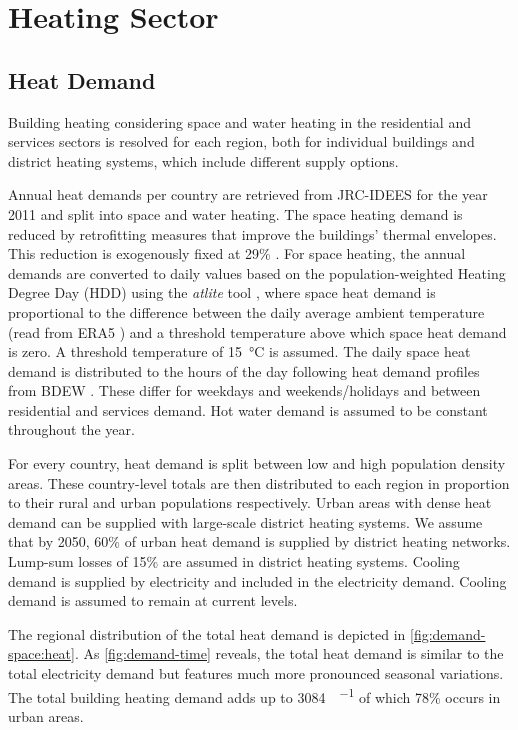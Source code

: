 \section{Heating Sector}
\label{sec:si:heat}

\subsection{Heat Demand}
\label{sec:si:heat:demand}

Building heating considering space and water heating in the residential and
services sectors is resolved for each region, both for individual buildings and
district heating systems, which include different supply options.

Annual heat demands per country are retrieved from JRC-IDEES  for
the year 2011 and split into space and water heating. The space heating demand
is reduced by retrofitting measures that improve the buildings' thermal
envelopes. This reduction is exogenously fixed at 29\%
. For space
heating, the annual demands are converted to daily values based on the
population-weighted Heating Degree Day (HDD) using the \textit{atlite} tool
, where space heat demand is proportional to the difference between the
daily average ambient temperature (read from ERA5 ) and a threshold
temperature above which space heat demand is zero. A threshold temperature of
\SI{15}{\celsius} is assumed. The daily space heat demand is distributed to the
hours of the day following heat demand profiles from BDEW \citeS{}. These differ
for weekdays and weekends/holidays and between residential and services demand.
Hot water demand is assumed to be constant throughout the year.

For every country, heat demand is split between low and high population density
areas. These country-level totals are then distributed to each region in
proportion to their rural and urban populations respectively. Urban areas with
dense heat demand can be supplied with large-scale district heating systems. We
assume that by 2050, 60\% of urban heat demand is supplied by district heating
networks. Lump-sum losses of 15\% are assumed in district heating systems.
Cooling demand is supplied by electricity and included in the electricity
demand. Cooling demand is assumed to remain at current levels.

The regional distribution of the total heat demand is depicted in
\cref{fig:demand-space:heat}. As \cref{fig:demand-time} reveals, the total heat
demand is similar to the total electricity demand but features much more
pronounced seasonal variations. The total building heating demand adds up to
\SI{3084}{\twh\per\year} of which 78\% occurs in urban areas.

